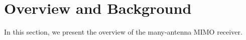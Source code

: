 \section{Overview and Background}\label{sec:overview}

In this section, we present the overview of the many-antenna MIMO receiver. 